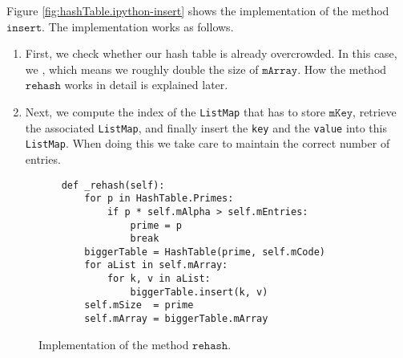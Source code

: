 Figure \ref{fig:hashTable.ipython-insert} shows the implementation of the method $\texttt{insert}$.
The implementation works as follows.
\begin{enumerate}
\item First, we check whether our hash table is already overcrowded.
      In this case, we , which means we roughly double the size of $\texttt{mArray}$.
      How the method $\texttt{rehash}$ works in detail is explained later.
\item Next, we compute the index of the \texttt{ListMap} that has to store
      $\texttt{mKey}$, retrieve the associated \texttt{ListMap}, and finally insert the \texttt{key} and the
      \texttt{value} into this \texttt{ListMap}.
      When doing this we take care to maintain the correct number of entries.
\end{enumerate}


\begin{figure}[!ht]
\centering
\begin{verbatim}
    def _rehash(self):
        for p in HashTable.Primes:
            if p * self.mAlpha > self.mEntries:
                prime = p
                break
        biggerTable = HashTable(prime, self.mCode)
        for aList in self.mArray:
            for k, v in aList:
                biggerTable.insert(k, v)
        self.mSize  = prime
        self.mArray = biggerTable.mArray
\end{verbatim}
\vspace*{-0.3cm}
\caption{Implementation of the method $\texttt{rehash}$.}
\label{fig:hashTable.ipython-rehash}
\end{figure}


